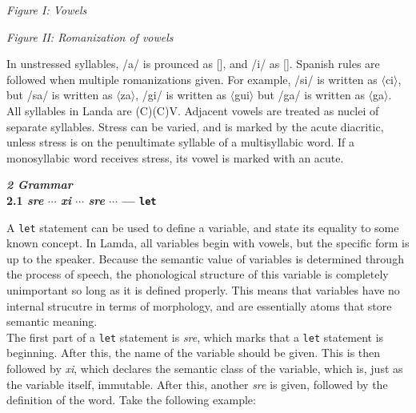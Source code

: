 \documentclass{article}[10pt]
\begin{document}
\begin{multicols}{2}
{\begin{center}
\emph{Figure I: Vowels}\\
 \Large
\begin{vowel}
\end{vowel} \end{center}}

{\begin{center}
\emph{Figure II: Romanization of vowels}\\
 \Large
\begin{vowel}
\end{vowel} \end{center}}
\end{multicols}

In unstressed syllables, /a/ is prounced as [], and /i/ as []. Spanish rules are followed when multiple romanizations given. For example, /si/ is written as $\langle$ci$\rangle$, but /sa/ is written as $\langle$za$\rangle$, /gi/ is written as $\langle$gui$\rangle$ but /ga/ is written as $\langle$ga$\rangle$. All syllables in Landa are (C)(C)V. Adjacent vowels are treated as nuclei of separate syllables. Stress can be varied, and is marked by the acute diacritic, unless stress is on the penultimate syllable of a multisyllabic word. If a monosyllabic word receives stress, its vowel is marked with an acute.

\clearpage
{\bf \emph{2 Grammar}}\\

{\bf 2.1 \emph{sre} $\cdots$ \emph{xi} $\cdots$ \emph{sre} $\cdots$ --- \texttt{let}}

A \texttt{let} statement can be used to define a variable, and state its equality to some known concept. In Lamda, all variables begin with vowels, but the specific form is up to the speaker. Because the semantic value of variables is determined through the process of speech, the phonological structure of this variable is completely unimportant so long as it is defined properly. This means that variables have no internal strucutre in terms of morphology, and are essentially atoms that store semantic meaning.\\

The first part of a \texttt{let} statement is \emph{sre}, which marks that a \texttt{let} statement is beginning. After this, the name of the variable should be given. This is then followed by \emph{xi}, which declares the semantic class of the variable, which is, just as the  variable itself, immutable. After this, another \emph{sre} is given, followed by the definition of the word. Take the following example:
\end{document}
